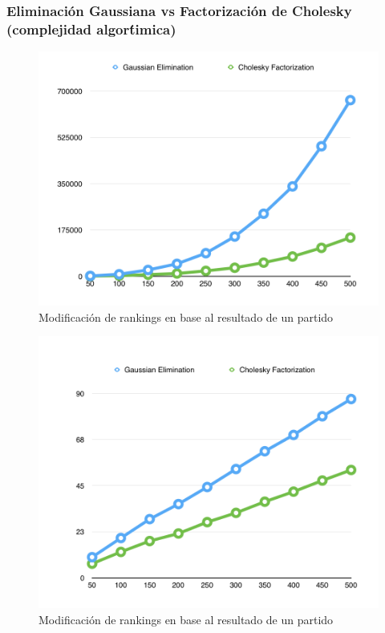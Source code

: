 \subsubsection{Eliminaci\'on Gaussiana vs Factorizaci\'on de Cholesky (complejidad algor\'timica)}

\begin{figure}[h!]
  \begin{center}
	\includegraphics[scale=0.50]{imagenes/cuantitative/default/default1.png}
	\caption{Modificaci\'on de rankings en base al resultado de un partido}
	\label{bChange}
  \end{center}
\end{figure}

\begin{figure}[h!]
  \begin{center}
	\includegraphics[scale=0.50]{imagenes/cuantitative/default/default2.png}
	\caption{Modificaci\'on de rankings en base al resultado de un partido}
	\label{bChange}
  \end{center}
\end{figure}
